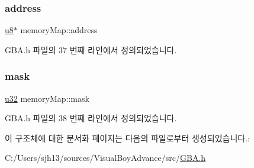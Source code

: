 \subsubsection{\texorpdfstring{address}{address}}
{\footnotesize\ttfamily \mbox{\hyperlink{_system_8h_aed742c436da53c1080638ce6ef7d13de}{u8}}$\ast$ memory\+Map\+::address}



G\+B\+A.\+h 파일의 37 번째 라인에서 정의되었습니다.

\mbox{\label{structmemory_map_ad1fc74c431f99d7fe2fbad6d199cfdc0}} 
\subsubsection{\texorpdfstring{mask}{mask}}
{\footnotesize\ttfamily \mbox{\hyperlink{_system_8h_a10e94b422ef0c20dcdec20d31a1f5049}{u32}} memory\+Map\+::mask}



G\+B\+A.\+h 파일의 38 번째 라인에서 정의되었습니다.



이 구조체에 대한 문서화 페이지는 다음의 파일로부터 생성되었습니다.\+:\begin{DoxyCompactItemize}
\item 
C\+:/\+Users/sjh13/sources/\+Visual\+Boy\+Advance/src/\mbox{\hyperlink{_g_b_a_8h}{G\+B\+A.\+h}}\end{DoxyCompactItemize}
